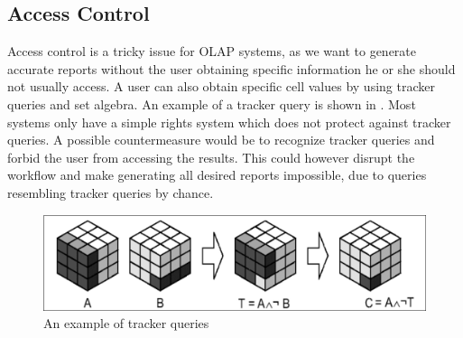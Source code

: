 \documentclass{article}
\begin{document}
\subsection{Access Control}
Access control is a tricky issue for OLAP systems, as we want to generate accurate reports without the user obtaining specific information he or she should not usually access.
A user can also obtain specific cell values by using tracker queries and set algebra.
An example of a tracker query is shown in .
Most systems only have a simple rights system which does not protect against tracker queries.
A possible countermeasure would be to recognize tracker queries and forbid the user from accessing the results.
This could however disrupt the workflow and make generating all desired reports impossible, due to queries resembling tracker queries by chance.

\begin{figure}[h]
    \centering
    \includegraphics[width=\textwidth]{tracker.png}
    \caption{An example of tracker queries}
    \label{fig:tracker}
\end{figure}
\end{document}
